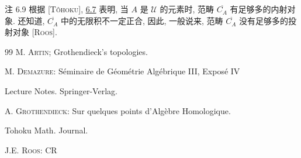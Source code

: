 \begin{enonce*}[remark]{注 6.9}
根据 [\textsc{Tôhoku}], \hyperref[II.prop6.7]{6.7} 表明,
当 $A$ 是 $𝒰$ 的元素时,
范畴 $C^{\widetilde{\phantom{,}}}_A$ 有足够多的内射对象.
还知道, $C^{\widetilde{\phantom{,}}}_A$ 中的无限积不一定正合,
因此, 一般说来, 范畴
$C^{\widetilde{\phantom{,}}}_A$ 没有足够多的投射对象
[\textsc{Roos}].
\end{enonce*}

\begin{thebibliography}{99}
 M. \textsc{Artin};\pageoriginale{} Grothendieck's topologies.

 M. \textsc{Demazure}: Séminaire de Géométrie Algébrique III,
  Exposé IV

Lecture Notes. Springer-Verlag.

 A. \textsc{Grothendieck}: Sur quelques points d'Algèbre
Homologique.

 Tohoku Math. Journal.

 J.E. \textsc{Roos}: CR
\end{thebibliography}

\ifx\danslelivre\undefined
%
%

\fi



